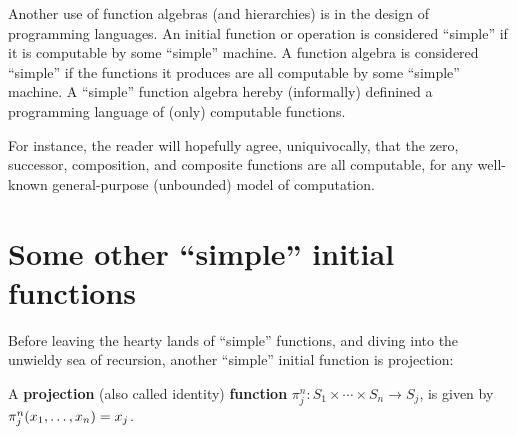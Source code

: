Another use of function algebras (and hierarchies) is in the design of
programming languages.  An initial function or operation is considered
``simple'' if it is computable by some ``simple'' machine. A function algebra
is considered ``simple'' if the functions it produces are all computable by
some ``simple'' machine.  A ``simple'' function algebra hereby (informally)
definined a programming language of (only) computable functions.

For instance, the reader will hopefully agree, uniquivocally, that the zero,
successor, composition, and composite functions are all computable, for any
well-known general-purpose (unbounded) model of computation.







\section{Some other ``simple'' initial functions}

Before leaving the hearty lands of ``simple'' functions, and diving into the
unwieldy sea of recursion, another ``simple'' initial function is projection:

\begin{definition} A \textbf{projection} (also called identity)
\textbf{function} $\pi_j^n : S_1 \times \cdots \times S_n \rightarrow S_j$, is
given by $\pi_j^n{\mathopen{}\left({x_1,\ldots,x_n}\right)\mathclose{}} = x_j$. \end{definition}

